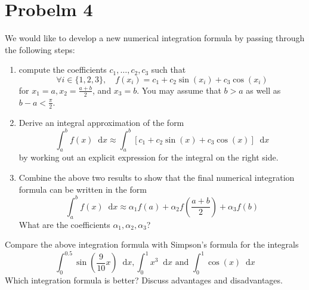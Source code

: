 \documentclass{article}
\newcommand*\diff{\mathop{}\!\mathrm{d}}
\theoremstyle{definition}
\begin{document}
\section{Probelm 4}
We would like to develop a new numerical integration formula by passing through the following steps:
\begin{enumerate}
	\item compute the coefficients $c_1,\dots,c_2,c_3$ such that
	\begin{equation}
		\forall i\in\{1,2,3\}, \quad f(x_i)=c_1+c_2\sin(x_i)+c_3\cos(x_i)
	\end{equation}
	for $x_1=a, x_2=\frac{a+b}{2}$, and $x_3=b$. You may assume that $b>a$ as well as $b-a<\frac{\pi}{2}$.
	\item Derive an integral approximation of the form
	\begin{equation}
		\int_{a}^{b}f(x)\diff x\approx \int_{a}^{b}\left[c_1+c_2\sin(x)+c_3\cos(x)\right]\diff x
	\end{equation}
	by working out an explicit expression for the integral on the right side.
	\item Combine the above two results to show that the final numerical integration formula can be written in the form
	\begin{equation}
		\int_{a}^{b}f(x)\diff x\approx \alpha_1f(a)+\alpha_2f\left(\frac{a+b}{2}\right)+\alpha_3f(b)
	\end{equation}
	What are the coefficients $\alpha_1,\alpha_2,\alpha_3$?
\end{enumerate}
Compare the above integration formula with Simpson’s formula for the
integrals
\begin{equation}
	\int_{0}^{0.5}\sin\left(\frac{9}{10}x\right)\diff x, \int_{0}^{1}x^3\diff x\text{ and }\int_{0}^{1}\cos(x)\diff x 
\end{equation}
Which integration formula is better? Discuss advantages and disadvantages.
\end{document}
